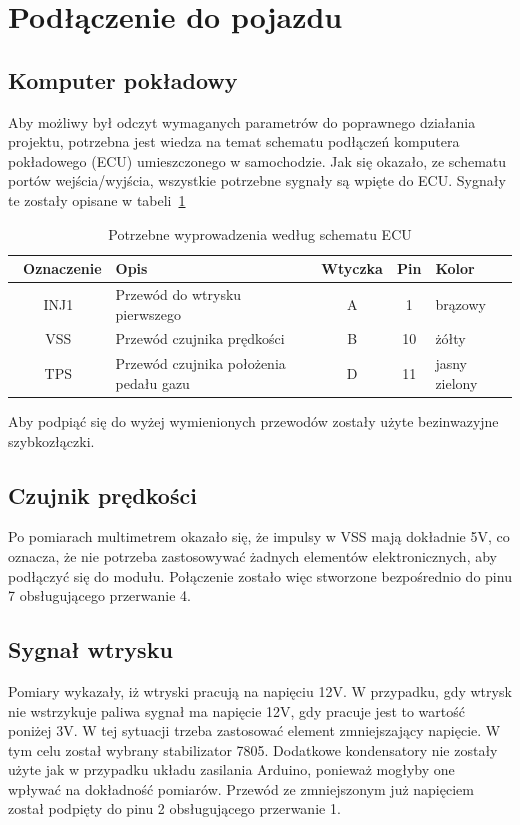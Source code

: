 \section{Podłączenie do pojazdu}
\subsection{Komputer pokładowy}
Aby możliwy był odczyt wymaganych parametrów do poprawnego działania projektu, potrzebna jest wiedza na temat schematu podłączeń komputera pokładowego (ECU) umieszczonego w samochodzie. Jak się okazało, ze schematu portów wejścia/wyjścia\cite{HondaPinout}, wszystkie potrzebne sygnały są wpięte do ECU. Sygnały te zostały opisane w tabeli~\ref{tab:ecu_pinout}

\begin{table}[htb] \small
\centering
\caption{Potrzebne wyprowadzenia według schematu ECU\cite{HondaPinout}}
\label{tab:ecu_pinout}
\begin{tabularx}{\linewidth}{|c|p{7cm}|c|c|X|} \hline\
\textbf{Oznaczenie} & \textbf{Opis} & \textbf{Wtyczka} &\textbf{ Pin} & \textbf{Kolor} \\ 
\hline
INJ1 & Przewód do wtrysku pierwszego & A & 1 & brązowy\\
\hline
VSS & Przewód czujnika prędkości & B & 10 & żółty\\
\hline
TPS & Przewód czujnika położenia pedału gazu & D & 11 & jasny zielony\\
\hline
\end{tabularx}
\end{table}

Aby podpiąć się do wyżej wymienionych przewodów zostały użyte bezinwazyjne szybkozłączki. 

\subsection{Czujnik prędkości} \label{vss}
Po pomiarach multimetrem okazało się, że impulsy w VSS mają dokładnie 5V, co oznacza, że nie potrzeba zastosowywać żadnych elementów elektronicznych, aby podłączyć się do modułu. Połączenie zostało więc stworzone bezpośrednio do pinu 7 obsługującego przerwanie 4.

\subsection{Sygnał wtrysku} \label{inj}
Pomiary wykazały, iż wtryski pracują na napięciu 12V. W przypadku, gdy wtrysk nie wstrzykuje paliwa sygnał ma napięcie 12V, gdy pracuje jest to wartość poniżej 3V. W tej sytuacji trzeba zastosować element zmniejszający napięcie. W tym celu został wybrany stabilizator 7805. Dodatkowe kondensatory nie zostały użyte jak w przypadku układu zasilania Arduino, ponieważ mogłyby one wpływać na dokładność pomiarów. Przewód ze zmniejszonym już napięciem został podpięty do pinu 2 obsługującego przerwanie 1.

